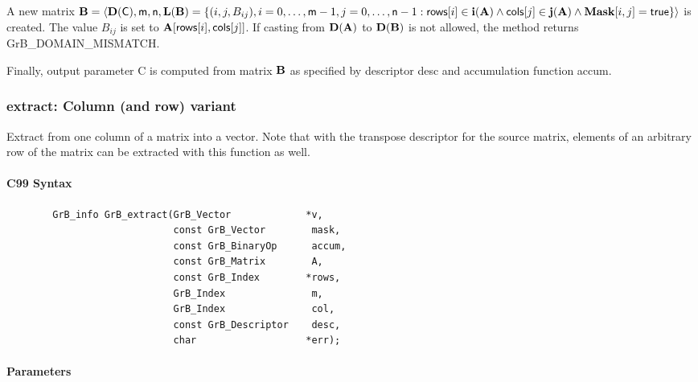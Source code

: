 A new matrix ${\bf B} = \langle \bold{D}({\sf C}),{\sf m},{\sf n},
\bold{L}({\bf B}) = \{ (i,j,B_{ij}), i = 0,\ldots,{\sf m}-1, j = 0, \ldots,{\sf n}-1 : {\sf rows}[i]
\in \bold{i}({\bf A}) \wedge {\sf cols}[j] \in \bold{j}({\bf A}) \wedge {\bf Mask}[i,j] = {\sf true} \} \rangle$
is created.  The value $B_{ij}$ is set to ${\bf A}[{\sf rows}[i],{\sf cols}[j]]$. If
casting from $\bold{D}({\bf A})$ to $\bold{D}({\bf B})$ is not
allowed, the method returns {\sf GrB\_DOMAIN\_MISMATCH}.

Finally, output parameter {\sf C} is computed from matrix ${\bf B}$ as
specified by descriptor {\sf desc} and accumulation function {\sf accum}.

\subsubsection{{\sf extract}: Column (and row) variant}

Extract from one column of a matrix into a vector.  Note that with the transpose
descriptor for the source matrix, elements of an arbitrary row of the matrix
can be extracted with this function as well.

\paragraph{C99 Syntax}

\begin{verbatim}
        GrB_info GrB_extract(GrB_Vector             *v,
                             const GrB_Vector        mask,
                             const GrB_BinaryOp      accum,
                             const GrB_Matrix        A,
                             const GrB_Index        *rows,
                             GrB_Index               m,
                             GrB_Index               col,
                             const GrB_Descriptor    desc,
                             char                   *err); 
\end{verbatim}

\paragraph{Parameters}

